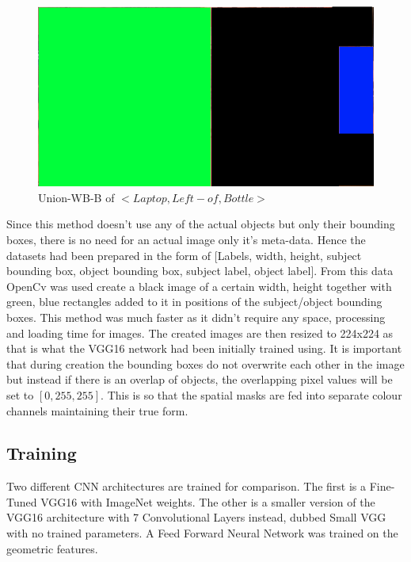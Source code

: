 \documentclass{csfyp}
\begin{document}
\begin{figure}[!htbp]
\centering
\includegraphics[scale=0.35]{UnionWBB.pdf}
\caption{Union-WB-B  of $<Laptop, Left-of , Bottle>$}
\end{figure}

Since this method doesn’t use any of the actual objects but only their bounding boxes, there is no need for an actual image only it’s meta-data. Hence the datasets had been prepared in the form of [Labels, width, height, subject bounding box, object bounding box, subject label, object label]. From this data OpenCv was used create a black image of a certain width, height together with green, blue rectangles added to it in positions of the subject/object bounding boxes. This method was much faster as it didn’t require any space, processing and loading time for images. The created images are then resized to 224x224 as that is what the VGG16 network had been initially trained using. It is important that during creation the bounding boxes do not overwrite each other in the image but instead if there is an overlap of objects, the overlapping pixel values will be set to $[0,255,255]$. This is so that the spatial masks are fed into separate colour channels maintaining their true form.


\subsection{Training}
Two different CNN architectures are trained for comparison. The first is a Fine-Tuned VGG16 with ImageNet weights. The other is a smaller version of the VGG16 architecture with 7 Convolutional Layers instead, dubbed Small VGG with no trained parameters. A Feed Forward Neural Network was trained on the geometric features.
\end{document}
